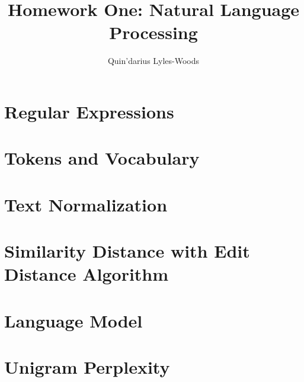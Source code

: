 \documentclass{article}
\title{Homework One: Natural Language Processing}
\author{Quin'darius Lyles-Woods}
\begin{document}
\maketitle
\section{Regular Expressions}

\section{Tokens and Vocabulary}

\section{Text Normalization}

\section{Similarity Distance with Edit Distance Algorithm}

\section{Language Model}

\section{Unigram Perplexity}

\end{document}
